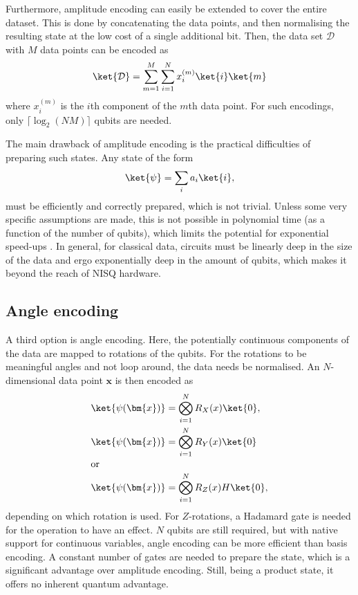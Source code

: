 Furthermore, amplitude encoding can easily be extended to cover the entire dataset.
This is done by concatenating the data points, and then normalising the resulting state at the low cost of a single additional bit.
Then, the data set $\mathcal{D}$ with $M$ data points can be encoded as
\begin{equation}
    \ket{\mathcal{D}} = \sum_{m=1}^M \sum_{i=1}^{N} x_i^{(m)} \ket{i} \ket{m}
\end{equation}
where $x_i^{(m)}$ is the $i$th component of the $m$th data point.
For such encodings, only $\lceil \log_2 (N M) \rceil$ qubits are needed.

The main drawback of amplitude encoding is the practical difficulties of preparing such states.
Any state of the form
\begin{equation}
    \ket{\psi} = \sum_{i} a_i \ket{i},
\end{equation}
must be efficiently and correctly prepared, which is not trivial.
Unless some very specific assumptions are made, this is not possible in polynomial time (as a function of the number of qubits), which limits the potential for exponential speed-ups \cite{schuld2018}.
In general, for classical data, circuits must be linearly deep in the size of the data and ergo exponentially deep in the amount of qubits, which makes it beyond the reach of NISQ hardware.

\subsection{Angle encoding}
A third option is angle encoding.
Here, the potentially continuous components of the data are mapped to rotations of the qubits.
For the rotations to be meaningful angles and not loop around, the data needs be normalised.
An $N$-dimensional data point $\bm{x}$ is then encoded as
\begin{align}
    \ket{\psi(\bm{x})} & = \bigotimes_{i=1}^{N} R_X(x) \ket{0},   \\
    \ket{\psi(\bm{x})} & = \bigotimes_{i=1}^{N} R_Y(x) \ket{0}    \\
    \intertext{or}
    \ket{\psi(\bm{x})} & = \bigotimes_{i=1}^{N} R_Z(x) H \ket{0},
\end{align}
depending on which rotation is used.
For $Z$-rotations, a Hadamard gate is needed for the operation to have an effect.
$N$ qubits are still required, but with native support for continuous variables, angle encoding can be more efficient than basis encoding.
A constant number of gates are needed to prepare the state, which is a significant advantage over amplitude encoding.
Still, being a product state, it offers no inherent quantum advantage.

